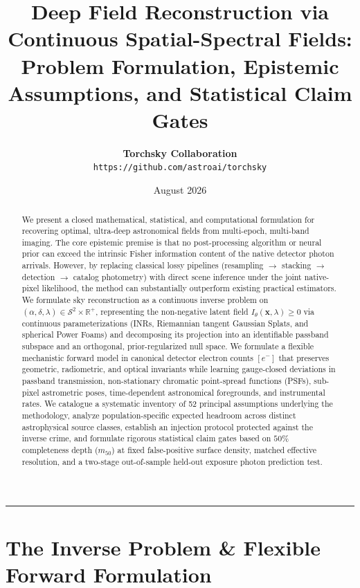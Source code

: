 \documentclass[11pt,a4paper]{article}
\title{\textbf{Deep Field Reconstruction via Continuous Spatial-Spectral Fields:\\
Problem Formulation, Epistemic Assumptions, and Statistical Claim Gates}}
\author{
    \textbf{Torchsky Collaboration} \\
    \texttt{https://github.com/astroai/torchsky}
}
\date{August 2026}
\begin{document}
\maketitle

\begin{abstract}
We present a closed mathematical, statistical, and computational formulation for recovering optimal, ultra-deep astronomical fields from multi-epoch, multi-band imaging. The core epistemic premise is that no post-processing algorithm or neural prior can exceed the intrinsic Fisher information content of the native detector photon arrivals. However, by replacing classical lossy pipelines (resampling $\to$ stacking $\to$ detection $\to$ catalog photometry) with direct scene inference under the joint native-pixel likelihood, the method can substantially outperform existing practical estimators. We formulate sky reconstruction as a continuous inverse problem on $(\alpha, \delta, \lambda) \in \mathcal{S}^2 \times \mathbb{R}^+$, representing the non-negative latent field $I_\theta(\boldsymbol{x}, \lambda) \ge 0$ via continuous parameterizations (INRs, Riemannian tangent Gaussian Splats, and spherical Power Foams) and decomposing its projection into an identifiable passband subspace and an orthogonal, prior-regularized null space. We formulate a flexible mechanistic forward model in canonical detector electron counts $[e^-]$ that preserves geometric, radiometric, and optical invariants while learning gauge-closed deviations in passband transmission, non-stationary chromatic point-spread functions (PSFs), sub-pixel astrometric poses, time-dependent astronomical foregrounds, and instrumental rates. We catalogue a systematic inventory of 52 principal assumptions underlying the methodology, analyze population-specific expected headroom across distinct astrophysical source classes, establish an injection protocol protected against the inverse crime, and formulate rigorous statistical claim gates based on $50\%$ completeness depth ($m_{50}$) at fixed false-positive surface density, matched effective resolution, and a two-stage out-of-sample held-out exposure photon prediction test.
\end{abstract}

\vspace{0.5em}
\hrule
\vspace{1em}

\section{The Inverse Problem \& Flexible Forward Formulation}
\end{document}

